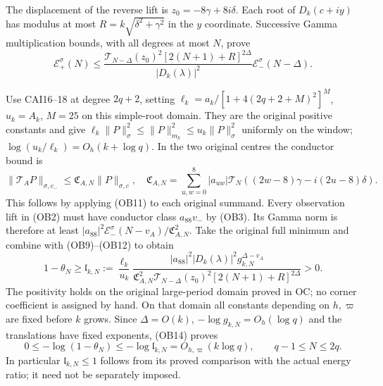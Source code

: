 The displacement of the reverse lift is $z_0=-8\gamma+8i\delta$.
Each root of $D_k(c+iy)$ has modulus at most
$R=k\sqrt{\delta^2+\gamma^2}$ in the $y$ coordinate.
Successive Gamma multiplication bounds, with all degrees at most $N$,
prove
\[
 \mathcal E_+^\sigma(N)\le
 \frac{\mathcal T_{N-\Delta}(z_0)^2[2(N+1)+R]^{2\Delta}}
 {|D_k(\lambda)|^2}\mathcal E_-^\sigma(N-\Delta).\tag{OB12}
\]

Use CAI16--18 at degree $2q+2$, setting
$\ell_k=a_k/[1+4(2q+2+M)^2]^M$, $u_k=A_k$, $M=25$ on this
simple-root domain. They are the original positive constants and give
$\ell_k\|P\|_\sigma^2\le\|P\|_{m_k}^2\le u_k\|P\|_\sigma^2$
uniformly on the window; $\log(u_k/\ell_k)=O_h(k+\log q)$.
In the two original centres the conductor bound is
\[
 \|\mathcal T_AP\|_{\sigma,c_-}\le\mathfrak C_{A,N}\|P\|_{\sigma,c},
 \quad\mathfrak C_{A,N}=\sum_{u,w=0}^8|a_{uw}|
 \mathcal T_N((2w-8)\gamma-i(2u-8)\delta).\tag{OB13}
\]
This follows by applying (OB11) to each original summand. Every
observation lift in (OB2) must have conductor class $a_{88}v_-$
by (OB3). Its Gamma norm is therefore at least
$|a_{88}|^2\mathcal E_-^\sigma(N-v_A)/\mathfrak C_{A,N}^2$.
Take the original full minimum and combine with (OB9)--(OB12) to obtain
\[
 1-\theta_N\ge\mathfrak l_{k,N}:=
 \frac{\ell_k}{u_k}
 \frac{|a_{88}|^2|D_k(\lambda)|^2g_{k,N}^{\Delta-v_A}}
 {\mathfrak C_{A,N}^2\mathcal T_{N-\Delta}(z_0)^2
 [2(N+1)+R]^{2\Delta}}>0.\tag{OB14}
\]
The positivity holds on the original large-period domain proved in OC;
no corner coefficient is assigned by hand. On that domain all constants
depending on $h,\varpi$ are fixed before $k$ grows. Since
$\Delta=O(k)$, $-\log g_{k,N}=O_h(\log q)$ and the translations
have fixed exponents, (OB14) proves
\[
 0\le-\log(1-\theta_N)\le-\log\mathfrak l_{k,N}
 =O_{h,\varpi}(k\log q),\qquad q-1\le N\le2q.\tag{OB15}
\]
In particular $\mathfrak l_{k,N}\le1$ follows from its proved comparison
with the actual energy ratio; it need not be separately imposed.

